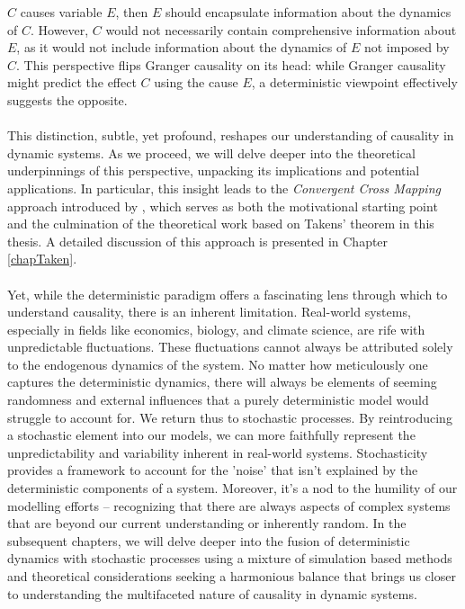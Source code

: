 \documentclass[11pt, a4paper]{memoir}
\theoremstyle{break}
\theoremstyle{break}
\theoremstyle{nonumberplain}
\begin{document}
$C$ causes variable $E$, then $E$ should encapsulate information about the dynamics of $C$. However, $C$ would not necessarily contain comprehensive information about $E$, as it would not include information about the dynamics of $E$ not imposed by $C$. This perspective flips Granger causality on its head: while Granger causality might predict the effect 
$C$ using the cause $E$, a deterministic viewpoint effectively suggests the opposite. \\\\
This distinction, subtle, yet profound, reshapes our understanding of causality in dynamic systems. As we proceed, we will delve deeper into the theoretical underpinnings of this perspective, unpacking its implications and potential applications. In particular, this insight leads to the \emph{Convergent Cross Mapping} approach introduced by \cite{Sugihara}, which serves as both the motivational starting point and the culmination of the theoretical work based on Takens' theorem in this thesis. A detailed discussion of this approach is presented in Chapter \ref{chapTaken}.\\\\
Yet, while the deterministic paradigm offers a fascinating lens through which to understand causality, there is an inherent limitation. Real-world systems, especially in fields like economics, biology, and climate science, are rife with unpredictable fluctuations. These fluctuations cannot always be attributed solely to the endogenous dynamics of the system. No matter how meticulously one captures the deterministic dynamics, there will always be elements of seeming randomness and external influences that a purely deterministic model would struggle to account for. We return thus to stochastic processes. By reintroducing a stochastic element into our models, we can more faithfully represent the unpredictability and variability inherent in real-world systems. Stochasticity provides a framework to account for the 'noise' that isn't explained by the deterministic components of a system. Moreover, it's a nod to the humility of our modelling efforts – recognizing that there are always aspects of complex systems that are beyond our current understanding or inherently random. 
In the subsequent chapters, we will delve deeper into the fusion of deterministic dynamics with stochastic processes using  a mixture of simulation based methods and theoretical considerations seeking a harmonious balance that brings us closer to understanding the multifaceted nature of causality in dynamic systems.
\newpage
\end{document}
